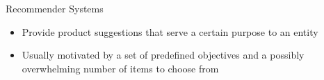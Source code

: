 \begin{frame}{Recommender Systems}
    \begin{itemize}
        \item Provide product suggestions that serve a certain purpose to an entity
        \item Usually motivated by a set  of  predefined objectives and a possibly  overwhelming number of items to choose from
    \end{itemize}
\end{frame}